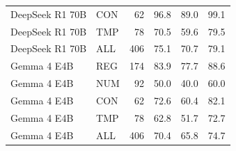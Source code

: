\begin{table}[h]
\begin{tabular}{llrrrr}
DeepSeek R1 70B & CON & 62 & 96.8 & 89.0 & 99.1 \\
DeepSeek R1 70B & TMP & 78 & 70.5 & 59.6 & 79.5 \\
DeepSeek R1 70B & ALL & 406 & 75.1 & 70.7 & 79.1 \\
\midrule
Gemma 4 E4B & REG & 174 & 83.9 & 77.7 & 88.6 \\
Gemma 4 E4B & NUM & 92 & 50.0 & 40.0 & 60.0 \\
Gemma 4 E4B & CON & 62 & 72.6 & 60.4 & 82.1 \\
Gemma 4 E4B & TMP & 78 & 62.8 & 51.7 & 72.7 \\
Gemma 4 E4B & ALL & 406 & 70.4 & 65.8 & 74.7 \\
\bottomrule
\end{tabular}
\end{table}
